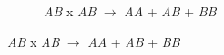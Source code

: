 \documentclass[a4paper,11pt,english]{article}
\begin{document}
\begin{figure}[H]
\begin{subfigure}[b]{0.5\textwidth}
                \label{fig:tiger}
        \end{subfigure}
        \centering
        
        \bigskip
        
        \begin{subfigure}[b]{0.5\textwidth}
                \caption{\emph{AB} x \emph{AB} \(\rightarrow\)  \emph{AA} + 
           \emph{AB} +  \emph{BB}}
                \label{fig:mouse}
        \end{subfigure}
\label{fig:animals}
\end{figure}
\end{document}
